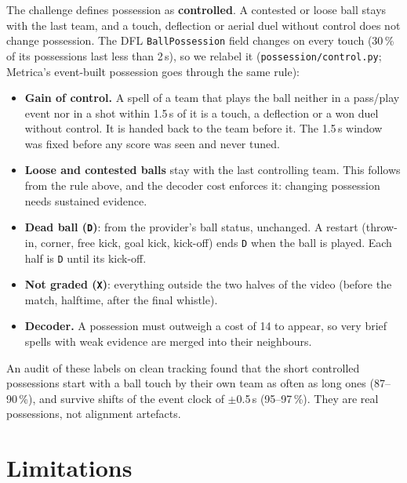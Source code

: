\documentclass[10pt,a4paper]{article}
\newcommand{\code}[1]{\texttt{#1}}
\begin{document}
The challenge defines possession as \textbf{controlled}. A contested or loose ball stays with the
last team, and a touch, deflection or aerial duel without control does not change possession. The
DFL \code{BallPossession} field changes on every touch (30\,\% of its possessions last less than
2\,s), so we relabel it (\code{possession/control.py}; Metrica's event-built possession goes
through the same rule):
\begin{itemize}
\item \textbf{Gain of control.} A spell of a team that plays the ball neither in a pass/play event
  nor in a shot within 1.5\,s of it is a touch, a deflection or a won duel without control. It is
  handed back to the team before it. The 1.5\,s window was fixed before any score was seen and
  never tuned.
\item \textbf{Loose and contested balls} stay with the last controlling team. This follows from the
  rule above, and the decoder cost enforces it: changing possession needs sustained evidence.
\item \textbf{Dead ball (\code{D})}: from the provider's ball status, unchanged. A restart
  (throw-in, corner, free kick, goal kick, kick-off) ends \code{D} when the ball is played. Each
  half is \code{D} until its kick-off.
\item \textbf{Not graded (\code{X})}: everything outside the two halves of the video (before the
  match, halftime, after the final whistle).
\item \textbf{Decoder.} A possession must outweigh a cost of 14 to appear, so very brief spells
  with weak evidence are merged into their neighbours.
\end{itemize}
An audit of these labels on clean tracking found that the short controlled possessions start with a
ball touch by their own team as often as long ones (87--90\,\%), and survive shifts of the event
clock of $\pm$0.5\,s (95--97\,\%). They are real possessions, not alignment artefacts.

\section{Limitations}\label{sec:limits}
\end{document}
